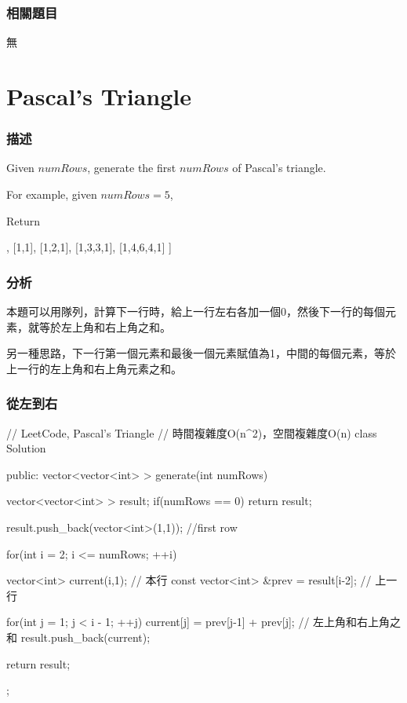 \subsubsection{相關題目}

\begindot
\item 無
\myenddot


\section{Pascal's Triangle} %
\label{sec:pascal-s-triangle}


\subsubsection{描述}
Given $numRows$, generate the first $numRows$ of Pascal's triangle.

For example, given $numRows = 5$,

Return
\begin{Code}
[
     [1],
    [1,1],
   [1,2,1],
  [1,3,3,1],
 [1,4,6,4,1]
]
\end{Code}


\subsubsection{分析}
本題可以用隊列，計算下一行時，給上一行左右各加一個0，然後下一行的每個元素，就等於左上角和右上角之和。

另一種思路，下一行第一個元素和最後一個元素賦值為1，中間的每個元素，等於上一行的左上角和右上角元素之和。


\subsubsection{從左到右}
\begin{Code}
// LeetCode, Pascal's Triangle
// 時間複雜度O(n^2)，空間複雜度O(n)
class Solution {
public:
    vector<vector<int> > generate(int numRows) {
        vector<vector<int> > result;
        if(numRows == 0) return result;

        result.push_back(vector<int>(1,1)); //first row

        for(int i = 2; i <= numRows; ++i) {
            vector<int> current(i,1);  // 本行
            const vector<int> &prev = result[i-2];  // 上一行

            for(int j = 1; j < i - 1; ++j) {
                current[j] = prev[j-1] + prev[j]; // 左上角和右上角之和
            }
            result.push_back(current);
        }
        return result;
    }
};
\end{Code}


